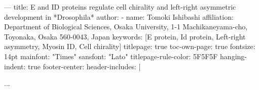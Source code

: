 ---
title: E and ID proteins regulate cell chirality and left-right asymmetric development in *Drosophila*
author:
- name: Tomoki Ishibashi
  affiliation: Department of Biological Sciences, Osaka University, 1-1 Machikaneyama-cho, Toyonaka, Osaka 560-0043, Japan
keywords: [E protein, Id protein, Left-right asymmetry, Myosin ID, Cell chirality]
titlepage: true
toc-own-page: true
fontsize: 14pt
mainfont: "Times"
sansfont: "Lato"
titlepage-rule-color: 5F5F5F
hanging-indent: true
footer-center: \thepage
header-includes: |
    \usepackage{seqsplit}
...


